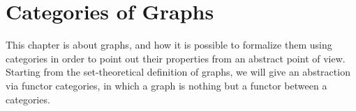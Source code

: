 \renewcommand{\graph}[1]{\mathcal{#1}}
\newcommand{\Graph}{\mathbf{Graph}}
\newcommand{\EqGrph}{\mathbf{EqGrph}}
\newcommand{\Q}{Q} %

\chapter{Categories of Graphs}
This chapter is about graphs, and how it is possible to formalize them using categories in order to point out their properties from an abstract point of view. Starting from the set-theoretical definition of graphs, we will give an abstraction via functor categories, in which a graph is nothing but a functor between a categories.

%
%


